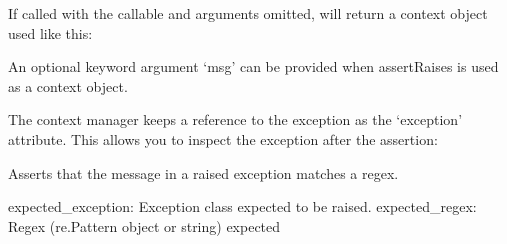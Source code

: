 \documentclass[letterpaper,10pt,english]{sphinxmanual}
\begin{document}
\begin{fulllineitems}
\begin{fulllineitems}
\sphinxAtStartPar
If called with the callable and arguments omitted, will return a
context object used like this:

\begin{sphinxVerbatim}[commandchars=\\\{\}]
 
\end{sphinxVerbatim}

\sphinxAtStartPar
An optional keyword argument ‘msg’ can be provided when assertRaises
is used as a context object.

\sphinxAtStartPar
The context manager keeps a reference to the exception as
the ‘exception’ attribute. This allows you to inspect the
exception after the assertion:

\begin{sphinxVerbatim}[commandchars=\\\{\}]
   
  
 
\end{sphinxVerbatim}

\end{fulllineitems}


\begin{fulllineitems}
\label{\detokenize{_autosummary/tests.test_unit.test_sqlite:tests.test_unit.test_sqlite.assertRaisesRegex}}
\pysigstartsignatures
{}
\pysigstopsignatures
\sphinxAtStartPar
Asserts that the message in a raised exception matches a regex.
\begin{description}
\sphinxAtStartPar
expected\_exception: Exception class expected to be raised.
expected\_regex: Regex (re.Pattern object or string) expected
\begin{quote}


\end{quote}
\end{description}
\end{fulllineitems}
\end{fulllineitems}
\end{document}
